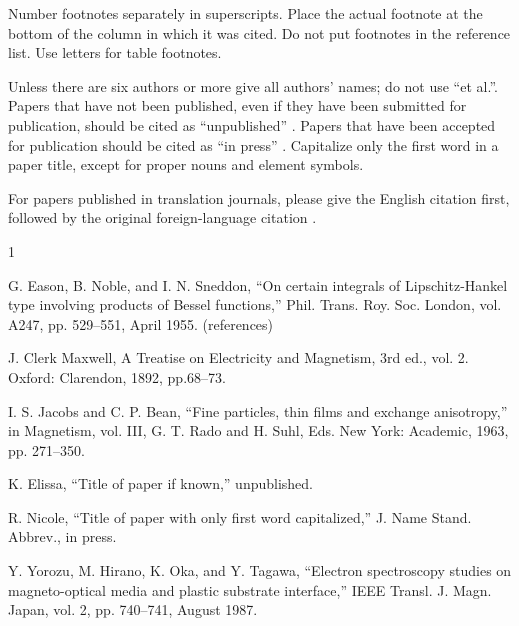 \documentclass[conference]{IEEEconf}
\begin{document}
Number footnotes separately in superscripts. Place the actual footnote at the bottom of the column in which it was cited. Do not put footnotes in the reference list. Use letters for table footnotes.

Unless there are six authors or more give all authors’ names; do not use “et al.”. Papers that have not been published, even if they have been submitted for publication, should be cited as “unpublished” \cite{aschermann2019redqueen}. Papers that have been accepted for publication should be cited as “in press” \cite{gan2020greyone}. Capitalize only the first word in a paper title, except for proper nouns and element symbols.

For papers published in translation journals, please give the English citation first, followed by the original foreign-language citation \cite{lemieux2018fairfuzz}.


\begin{thebibliography}{1}

G. Eason, B. Noble, and I. N. Sneddon, “On certain integrals of Lipschitz-Hankel type involving products of Bessel functions,” Phil. Trans. Roy. Soc. London, vol. A247, pp. 529–551, April 1955. (references)

J. Clerk Maxwell, A Treatise on Electricity and Magnetism, 3rd ed., vol. 2. Oxford: Clarendon, 1892, pp.68–73.

I. S. Jacobs and C. P. Bean, “Fine particles, thin films and exchange anisotropy,” in Magnetism, vol. III, G. T. Rado and H. Suhl, Eds. New York: Academic, 1963, pp. 271–350.

K. Elissa, “Title of paper if known,” unpublished.

R. Nicole, “Title of paper with only first word capitalized,” J. Name Stand. Abbrev., in press.

Y. Yorozu, M. Hirano, K. Oka, and Y. Tagawa, “Electron spectroscopy studies on magneto-optical media and plastic substrate interface,” IEEE Transl. J. Magn. Japan, vol. 2, pp. 740–741, August 1987.




\end{thebibliography}

\else




\fi
%

%
\balance
\end{document}
